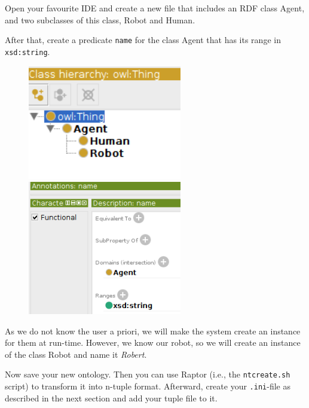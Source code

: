 \documentclass[a4paper]{report}
\begin{document}
Open your favourite IDE and create a new file that includes an RDF class Agent, and two subclasses of this class, Robot and Human.

After that, create a predicate \texttt{name} for the class Agent that has its range in \texttt{xsd:string}.

\begin{figure}
	\center
	    \begin{minipage}{0.45\textwidth}
		\centering
		\includegraphics[width=0.6\textwidth]{Images/doc_protege.png}
	\end{minipage}\hfill
	\begin{minipage}{0.45\textwidth}
		\centering
		\includegraphics[width=0.6\textwidth]{Images/doc_protege2.png}
	\end{minipage}
\end{figure}

As we do not know the user a priori, we will make the system create an instance for them at run-time. However, we know our robot, so we will create an instance of the class Robot and name it \textit{Robert}.

Now save your new ontology. Then you can use Raptor (i.e., the \texttt{ntcreate.sh} script) to transform it into n-tuple format. Afterward, create your \texttt{.ini}-file as described in the next section and add your tuple file to it.
\end{document}
